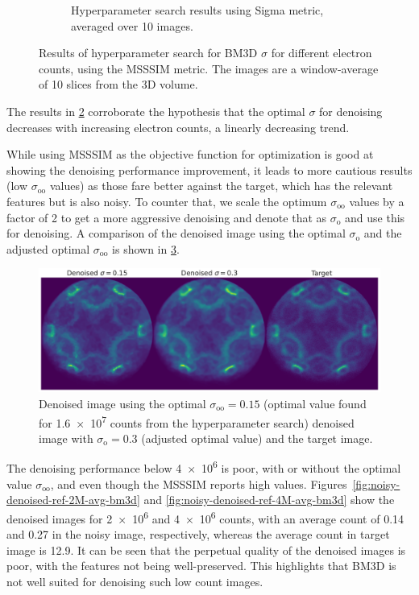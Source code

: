 \begin{figure}[h]
\begin{subfigure}[t]{0.49\linewidth}
        \caption{Hyperparameter search results using Sigma metric, averaged over 10 images.}
        \label{fig:hyperparameter-sigma-averaged-10-images}
    \end{subfigure}
    \caption{Results of hyperparameter search for \gls{BM3D} $\sigma$ for different electron counts, using the \gls{MSSSIM} metric. The images are a window-average of \num{10} slices from the 3D volume.}
    \label{fig:hyperparameter-averaged-10-images}
\end{figure}

The results in \cref{fig:hyperparameter-averaged-10-images} corroborate the hypothesis that the optimal $\sigma$ for denoising decreases with increasing electron counts, a linearly decreasing trend.

While using \gls{MSSSIM} as the objective function for optimization is good at showing the denoising performance improvement, it leads to more cautious results (low $\sigma_{\text{oo}}$ values) as those fare better against the target, which has the relevant features but is also noisy. To counter that, we scale the optimum $\sigma_{\text{oo}}$ values by a factor of 2 to get a more aggressive denoising and denote that as $\sigma_{\text{o}}$ and use this for denoising. A comparison of the denoised image using the optimal $\sigma_{\text{o}}$ and the adjusted optimal $\sigma_{\text{oo}}$ is shown in \cref{fig:denoised-optimal-sigma}.

\begin{figure}[h]
    \centering
    \includegraphics[width=1\linewidth]{images/denoised_optimal_sigma.pdf}
    \caption{Denoised image using the optimal $\sigma_{\text{oo}}=0.15$ (optimal value found for \num{1.6e7} counts from the hyperparameter search) denoised image with $\sigma_{\text{o}}=0.3$ (adjusted optimal value) and the target image.}
    \label{fig:denoised-optimal-sigma}
\end{figure}

The denoising performance below \num{4e6} is poor, with or without the optimal value $\sigma_{\text{oo}}$, and even though the \gls{MSSSIM} reports high values. Figures~\ref{fig:noisy-denoised-ref-2M-avg-bm3d} and \ref{fig:noisy-denoised-ref-4M-avg-bm3d} show the denoised images for \num{2e6} and \num{4e6} counts, with an average count of \num{0.14} and \num{0.27} in the noisy image, respectively, whereas the average count in target image is \num{12.9}. It can be seen that the perpetual quality of the denoised images is poor, with the features not being well-preserved. This highlights that \gls{BM3D} is not well suited for denoising such low count images.

